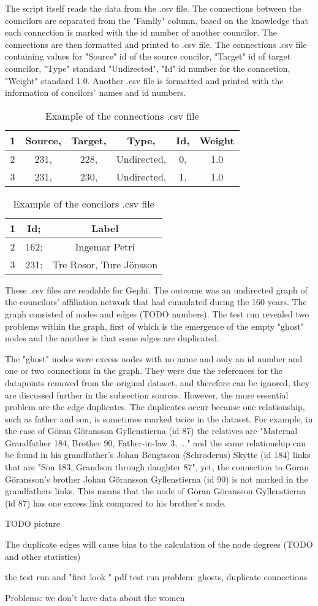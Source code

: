 \documentclass[a4paper,12pt]{article}
\begin{document}
The script itself reads the data from the .csv file. The connections between the councilors are separated from the "Family" column, based on the knowledge that each connection is marked with the id number of another councilor. The connections are then formatted and printed to .csv file. The connections .csv file containing values for "Source" id of the source concilor, "Target" id of target councilor, "Type" standard "Undirected", "Id" id number for the conncetion, "Weight" standard 1.0. Another .csv file is formatted and printed with the information of concilors' names and id numbers.

\begin{table}[h]
	\caption{Example of the connections .csv file}
	\centering
	\begin{tabular}{cccccc}
		\hline
		1 &Source, &Target, &Type, &Id, &Weight \\
		\hline
		2 &231, &228, &Undirected, &0, &1.0 \\
		\hline
		3 &231, &230, &Undirected, &1, &1.0 \\
		\hline
	\end{tabular}
\end{table}
\begin{table}[h]
	\caption{Example of the concilors .csv file}
	\centering
	\begin{tabular}{ccc}	
		\hline
		1 &Id; &Label \\
		\hline
		2 &162; &Ingemar Petri \\
		\hline
		3 &231; &Tre Rosor, Ture Jönsson \\
		\hline
	\end{tabular}
\end{table}

These .csv files are readable for Gephi. The outcome was an undirected graph of the councilors' affiliation network that had cumulated during the 160 years. The graph consisted of nodes and edges (TODO numbers). The test run revealed two problems within the graph, first of which is the emergence of the empty "ghost" nodes and the another is that some edges are duplicated. 

The "ghost" nodes were excess nodes with no name and only an id number and one or two connections in the graph. They were due the references for the datapoints removed from the original dataset, and therefore can be ignored, they are discussed further in the subsection sources. However, the more essential problem are the edge duplicates. The duplicates occur because one relationship, such as father and son, is sometimes marked twice in the dataset. For example, in the case of Göran Göransson Gyllenstierna (id 87) the relatives are "Maternal Grandfather 184, Brother 90, Father-in-law 3, ..." and the same relationship can be found in his grandfather's Johan Bengtsson (Schroderus) Skytte (id 184) links that are "Son 183, Grandson through daughter 87", yet, the connection to Göran Göransson's brother Johan Göransson Gyllenstierna (id 90) is not marked in the grandfathers links. This means that the node of Göran Göransson Gyllenstierna (id 87) has one excess link compared to his brother's node. 

TODO picture

The duplicate edges will cause bias to the calculation of the node degrees (TODO and other statistics)


the test run and "first look " pdf
test run problem: ghosts, duplicate connections

Problems: we don't have data about the women
\end{document}
